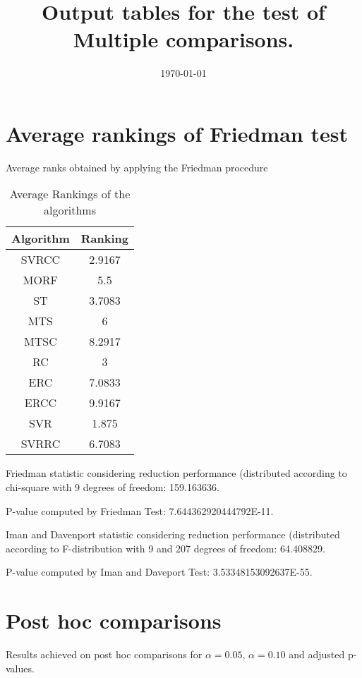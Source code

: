 \documentclass[a4paper,10pt]{article}
\title{Output tables for the test of Multiple comparisons.}
\author{}
\date{\today}
\begin{document}
\begin{landscape}
\pagestyle{empty}
\maketitle
\thispagestyle{empty}
\section{Average rankings of Friedman test}



Average ranks obtained by applying the Friedman procedure

\begin{table}[!htp]
\centering
\begin{tabular}{|c|c|}\hline
Algorithm&Ranking\\\hline
SVRCC & 2.9167\\
MORF & 5.5\\
ST & 3.7083\\
MTS & 6\\
MTSC & 8.2917\\
RC & 3\\
ERC & 7.0833\\
ERCC & 9.9167\\
SVR & 1.875\\
SVRRC & 6.7083\\
\hline
\end{tabular}
\caption{Average Rankings of the algorithms}
\end{table}

Friedman statistic considering reduction performance (distributed according to chi-square with 9 degrees of freedom: 159.163636.

P-value computed by Friedman Test: 7.644362920444792E-11.\newline

Iman and Davenport statistic considering reduction performance (distributed according to F-distribution with 9 and 207 degrees of freedom: 64.408829.

P-value computed by Iman and Daveport Test: 3.53348153092637E-55.\newline



\pagebreak

\section{Post hoc comparisons}

Results achieved on post hoc comparisons for $\alpha = 0.05$, $\alpha = 0.10$ and adjusted p-values.


\end{landscape}
\end{document}
